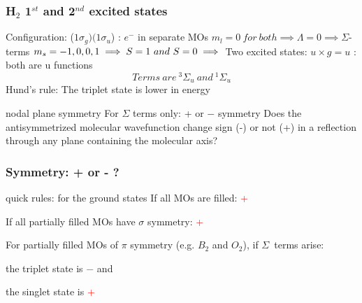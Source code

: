 \documentclass[a4paper,titlepage]{article}
\begin{document}
\begin{frame}
\frametitle{H\(_2\) 1\(^{st}\) and 2\(^{nd}\) excited states}
Configuration: \enspace (\(1\sigma_g)(1\sigma_u\)) : \quad \(e^-\) in separate MOs
\(m_l=0 \ for \ both \implies \Lambda = 0 \implies \Sigma\)-terms\newline
\(m_s = -1,0,0,1 \implies S=1 \ and \ S=0\newline
\implies\) Two excited states:
\(u \times g = u\) : both are u functions\newline
\[ Terms\ are\ ^3\Sigma_u \ and \ ^1\Sigma_u\]
Hund's rule: The triplet state is lower in energy\newline\begin{block}{nodal plane symmetry}
For \(\Sigma\) terms only: + or \(-\) symmetry\newline
Does the antisymmetrized molecular wavefunction change sign (-) or not (+) in a reflection through any plane containing the molecular axis?\end{block}
\end{frame}

\begin{frame}
\frametitle{Symmetry: + or - ?}
\begin{block}{quick rules: for the ground states}
If all MOs are filled: \textcolor{red}{+}

\medskip If all partially filled MOs have \(\sigma\) symmetry: \textcolor{red}{+}

\medskip For partially filled MOs of \(\pi\) symmetry (e.g. \(B_2\) and \(O_2\)), if \(\Sigma\)~terms arise:

\medskip \quad the triplet state is \textcolor{red}{\(-\)} and 

\medskip \quad the singlet state is \textcolor{red}{+}
\end{block}
\end{frame}
\end{document}
